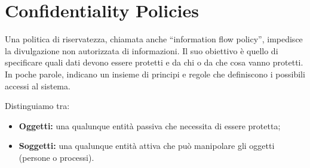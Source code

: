 \section{Confidentiality Policies}

Una politica di riservatezza, chiamata anche ``information flow policy'',
impedisce la divulgazione
non autorizzata di informazioni. Il suo obiettivo è quello di specificare quali
dati devono essere
protetti e da chi o da che cosa vanno protetti. In poche parole, indicano un
insieme di principi e
regole che definiscono i possibili accessi al sistema.

Distinguiamo tra:

\begin{itemize}
    \item \textbf{Oggetti:} una qualunque entità passiva che necessita di
          essere protetta;
    \item \textbf{Soggetti:} una qualunque entità attiva che può manipolare
          gli oggetti (persone o processi).
\end{itemize}

